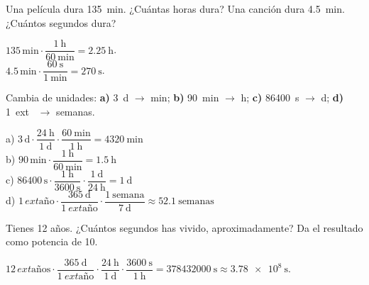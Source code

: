\begin{exercise}
    Una película dura \qty{135}{\minute}. ¿Cuántas horas dura? Una canción dura \qty{4.5}{\minute}. ¿Cuántos segundos dura?
    \begin{solu}
        \(\num{135}\,\unit{\minute} \cdot \dfrac{\qty{1}{\hour}}{\qty{60}{\minute}} = \qty{2.25}{\hour}\). \\
        \(\num{4.5}\,\unit{\minute} \cdot \dfrac{\qty{60}{\s}}{\qty{1}{\minute}} = \qty{270}{\s}\).
    \end{solu}
\end{exercise}

\begin{exercise}
    Cambia de unidades: \textbf{a)} \qty{3}{\day} \(\to\) \unit{\minute}; \textbf{b)} \qty{90}{\minute} \(\to\) \unit{\hour}; \textbf{c)} \qty{86400}{\s} \(\to\) \unit{\day}; \textbf{d)} \qty{1}{	ext{}} \(\to\) semanas.
    \begin{solu}
        a) \(\num{3}\,\unit{\day} \cdot \dfrac{\qty{24}{\hour}}{\qty{1}{\day}} \cdot \dfrac{\qty{60}{\minute}}{\qty{1}{\hour}} = \qty{4320}{\minute}\) \\
        b) \(\num{90}\,\unit{\minute} \cdot \dfrac{\qty{1}{\hour}}{\qty{60}{\minute}} = \qty{1.5}{\hour}\) \\
        c) \(\num{86400}\,\unit{\s} \cdot \dfrac{\qty{1}{\hour}}{\qty{3600}{\s}} \cdot \dfrac{\qty{1}{\day}}{\qty{24}{\hour}} = \qty{1}{\day}\) \\
        d) \(\num{1}\,\unit{	ext{\text{año}}} \cdot \dfrac{\qty{365}{\day}}{\qty{1}{	ext{\text{año}}}} \cdot \dfrac{\qty{1}{\text{semana}}}{\qty{7}{\day}} \approx \qty{52.1}{\text{semanas}}\)
    \end{solu}
\end{exercise}

\begin{exercise}
    Tienes 12 años. ¿Cuántos segundos has vivido, aproximadamente? Da el resultado como potencia de 10.
    \begin{solu}
        \(\num{12}\,\unit{	ext{\text{años}}} \cdot \dfrac{\qty{365}{\day}}{\qty{1}{	ext{\text{año}}}} \cdot \dfrac{\qty{24}{\hour}}{\qty{1}{\day}} \cdot \dfrac{\qty{3600}{\s}}{\qty{1}{\hour}} = \qty{378432000}{\s} \approx \qty{3.78e8}{\s}\).
    \end{solu}
\end{exercise}

